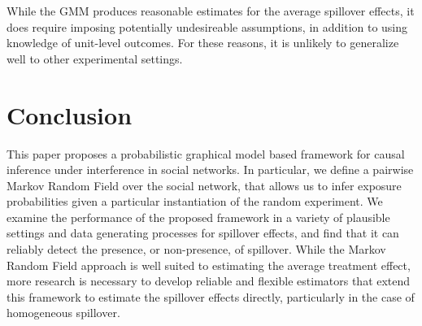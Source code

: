 \documentclass{article}
\begin{document}
While the GMM produces reasonable estimates for the average spillover effects, it does require imposing potentially undesireable assumptions, in 
addition to using knowledge of unit-level outcomes. For these reasons, it is unlikely to generalize well to other experimental settings.   

\section{Conclusion}

This paper proposes a probabilistic graphical model based framework for causal inference under interference in social networks. In particular, 
we define a pairwise Markov Random Field over the social network, that allows us to infer exposure probabilities given a particular instantiation of the 
random experiment. We examine the performance of the proposed framework in a variety of plausible settings and data generating processes for spillover effects,
and find that it can reliably detect the presence, or non-presence, of spillover. While the Markov Random Field approach is well suited to estimating the average treatment effect, 
more research is necessary to develop reliable and flexible estimators that extend this framework to estimate the spillover effects directly, particularly in the case of homogeneous 
spillover. 


















\end{document}
